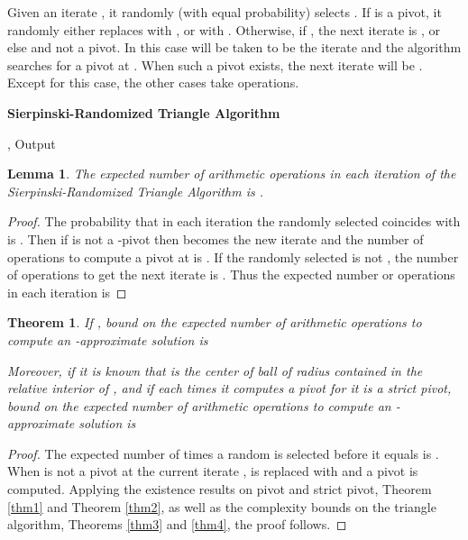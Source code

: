 \documentclass{article}
\newtheorem{thm}{Theorem}
\newtheorem{lemma}{Lemma}
\theoremstyle{definition}
\begin{document}
Given an iterate , it randomly (with equal probability) selects . If  is a pivot, it randomly  either replaces  with , or with . Otherwise, if , the next iterate is , or else  and not a pivot. In this case  will be taken to be the iterate and the algorithm searches for a pivot  at .  When such a pivot exists, the next iterate will be . Except for this case, the other cases take  operations.

\begin{algorithm}[htpb]
{\bf Sierpinski-Randomized Triangle Algorithm}\

 \KwIn {, , }
, \;
 Output \;
\end{algorithm}


\begin{lemma} The expected number of arithmetic operations in each iteration of the Sierpinski-Randomized Triangle Algorithm is .
\end{lemma}

\begin{proof} The probability that in each iteration the randomly selected  coincides with  is . Then if  is not a -pivot then  becomes the new iterate and the number of operations to compute a pivot  at  is . If the randomly selected  is not , the number of operations to get the next iterate  is .  Thus the expected number or operations in each iteration is

\end{proof}

\begin{thm} If , bound on the expected number of arithmetic operations to compute an -approximate solution is

Moreover, if it is known that  is the center of ball of radius  contained in the relative interior of , and if each times it computes a pivot  for  it is a strict pivot, bound on the expected number of arithmetic operations to compute an -approximate solution is

\end{thm}
\begin{proof} The expected number of times a random  is selected before it equals  is . When  is not a pivot at the current iterate ,   is replaced with  and a pivot  is computed.  Applying the existence results on  pivot and strict pivot, Theorem \ref{thm1} and Theorem \ref{thm2}, as well as the complexity bounds on the triangle algorithm, Theorems \ref{thm3} and \ref{thm4}, the proof follows.
\end{proof}
\end{document}

